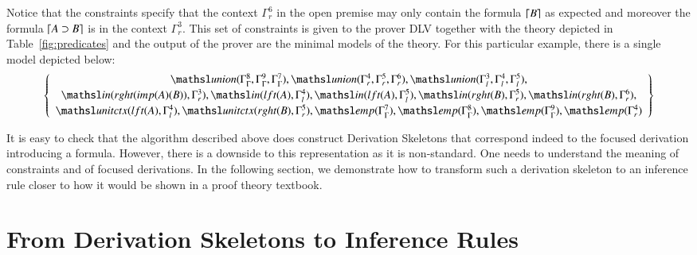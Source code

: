 \documentclass[a4paper,10pt]{article}
\newcommand{\elin}[2]{\ensuremath{{\tsl{unitctx}(\ensuremath{#1}, \ensuremath{#2})}}}
\newcommand{\emp}[1]{\ensuremath{{\tsl{emp}(\ensuremath{#1})}}}
\newcommand{\union}[3]{\ensuremath{{\tsl{union}(\ensuremath{#1},\ensuremath{#2},\ensuremath{ #3})}}}
\newcommand{\In}[2]{\ensuremath{\tsl{in}(\ensuremath{#1},\ensuremath{#2})}}
\begin{document}
Notice that the constraints specify that the context $\Gamma^6_r$ in the open premise 
may only contain the formula $\lceil B \rceil$ as expected and moreover the formula $\lceil A \supset B \rceil$ is in the context
$\Gamma^3_r$. This set of constraints is given to the prover DLV together with the theory depicted in Table~\ref{fig:predicates} and the 
output of the prover are the minimal models of the theory. For this particular example, there is a single model depicted below:
\[
 \left\{\begin{array}{c}
\union{\Gamma_{\Gamma}^{8}}{\Gamma_{\Gamma}^{9}}{ \Gamma_{\Gamma}^{7}}, 
\union{\Gamma_{r}^{4}}{\Gamma_{r}^{5}}{\Gamma_{r}^{6}}, \union{\Gamma_{l}^{3}}{ \Gamma_{l}^{4}}{ \Gamma_{l}^{5}},\\[2pt]
\In{rght (imp (A) (B) )}{\Gamma_{r}^{3}}, \In{lft (A)} {\Gamma_{l}^{4}},
\In{lft (A)} {\Gamma_{l}^{5}},\In{rght (B) }{ \Gamma_{r}^{5}},\In { rght (B)} { \Gamma_{r}^{6}},\\[2pt]
\elin{ lft (A) }{ \Gamma_{l}^{4}}, \elin{rght (B)}{ \Gamma_{r}^{5}}, 
\emp{\Gamma_{\Gamma}^{7}},\emp{\Gamma_{\Gamma}^{8}},\emp{\Gamma_{\Gamma}^{9}},\emp{\Gamma_{r}^{4}}
        \end{array}
 \right\}
\]
 
It is easy to check that the algorithm described above does construct Derivation Skeletons that correspond
indeed to the focused derivation introducing a formula. However, there is a downside to this representation as it is 
non-standard. One needs to understand the meaning of constraints and of focused derivations.  In the following section, 
we demonstrate how to transform such a derivation skeleton to an inference rule closer to how it would be shown in a 
proof theory textbook.



\section{From Derivation Skeletons to Inference Rules}
\end{document}
